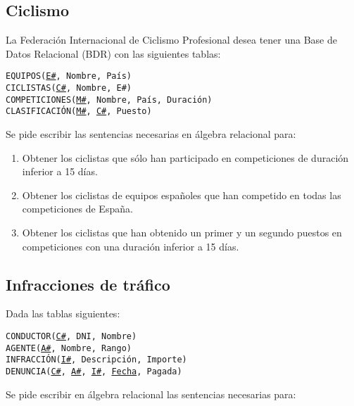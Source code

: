 \documentclass{db-practice}
\begin{document}
\subsection{Ciclismo}

La Federación Internacional de Ciclismo Profesional desea tener una Base de Datos Relacional (BDR) con las siguientes tablas:

\begin{addmargin}[1.5em]{0em}
    \texttt{EQUIPOS(\underline{E\#}, Nombre, País)}\\
    \texttt{CICLISTAS(\underline{C\#}, Nombre, E\#)}\\
    \texttt{COMPETICIONES(\underline{M\#}, Nombre, País, Duración)}\\
    \texttt{CLASIFICACIÓN(\underline{M\#}, \underline{C\#}, Puesto)}
\end{addmargin}

Se pide escribir las sentencias necesarias en álgebra relacional para:

\begin{enumerate}
    \item Obtener los ciclistas que sólo han participado en competiciones de duración inferior a 15 días.
    \item Obtener los ciclistas de equipos españoles que han competido en todas las competiciones de España.
    \item Obtener los ciclistas que han obtenido un primer y un segundo puestos en competiciones con una duración inferior a 15 días.
\end{enumerate}

\subsection{Infracciones de tráfico}

Dada las tablas siguientes:

\begin{addmargin}[1.5em]{0em}
    \texttt{CONDUCTOR(\underline{C\#}, DNI, Nombre)}\\
    \texttt{AGENTE(\underline{A\#}, Nombre, Rango)}\\
    \texttt{INFRACCIÓN(\underline{I\#}, Descripción, Importe)}\\
    \texttt{DENUNCIA(\underline{C\#}, \underline{A\#}, \underline{I\#}, \underline{Fecha}, Pagada)}
\end{addmargin}

Se pide escribir en álgebra relacional las sentencias necesarias para:
\end{document}
